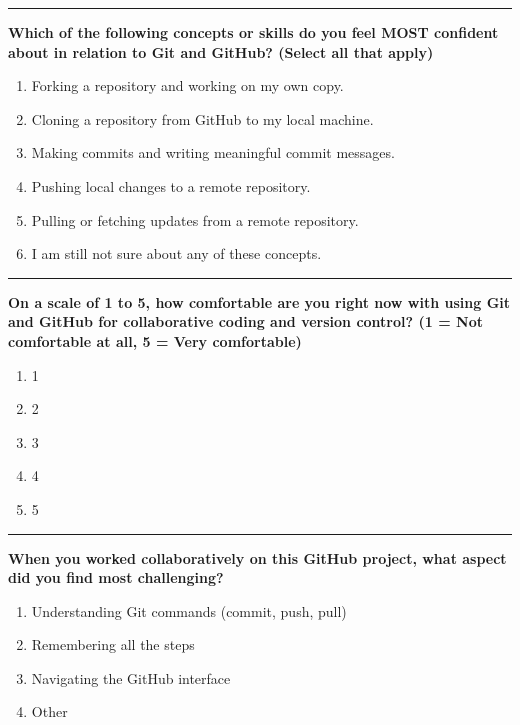\documentclass[
  letterpaper,
  DIV=11,
  numbers=noendperiod]{scrartcl}
\begin{document}
\begin{center}\rule{0.5\linewidth}{0.5pt}\end{center}

\textbf{Which of the following concepts or skills do you feel MOST
confident about in relation to Git and GitHub? (Select all that apply)}

\begin{enumerate}
\def\labelenumi{\alph{enumi}.}
\item
  Forking a repository and working on my own copy.
\item
  Cloning a repository from GitHub to my local machine.
\item
  Making commits and writing meaningful commit messages.
\item
  Pushing local changes to a remote repository.
\item
  Pulling or fetching updates from a remote repository.
\item
  I am still not sure about any of these concepts.
\end{enumerate}

\begin{center}\rule{0.5\linewidth}{0.5pt}\end{center}

\textbf{On a scale of 1 to 5, how comfortable are you right now with
using Git and GitHub for collaborative coding and version control? (1 =
Not comfortable at all, 5 = Very comfortable)}

\begin{enumerate}
\def\labelenumi{\alph{enumi}.}
\item
  1
\item
  2
\item
  3
\item
  4
\item
  5
\end{enumerate}

\begin{center}\rule{0.5\linewidth}{0.5pt}\end{center}

\textbf{When you worked collaboratively on this GitHub project, what
aspect did you find most challenging?}

\begin{enumerate}
\def\labelenumi{\alph{enumi}.}
\item
  Understanding Git commands (commit, push, pull)
\item
  Remembering all the steps
\item
  Navigating the GitHub interface
\item
  Other
\end{enumerate}
\end{document}
